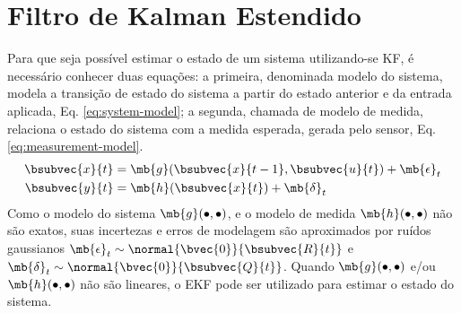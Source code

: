 \section{Filtro de Kalman Estendido}
\label{sec:ekf}
Para que seja possível estimar o estado de um sistema utilizando-se KF, é 
necessário conhecer duas equações: a primeira, denominada modelo do sistema, 
modela a transição de estado do sistema a partir do estado anterior e da entrada aplicada, Eq. \ref{eq:system-model}; a segunda, chamada de modelo de medida, relaciona o estado do sistema com a medida esperada, gerada pelo sensor, Eq. \ref{eq:measurement-model}. 
\begin{align}
  \bsubvec{x}{t} &= \mb{g}(\bsubvec{x}{t-1}, \bsubvec{u}{t}) + \mb{\epsilon}_t
  \label{eq:system-model}\\
  \bsubvec{y}{t} &= \mb{h}(\bsubvec{x}{t}) + \mb{\delta}_t
  \label{eq:measurement-model}
\end{align}
Como o modelo do sistema $\mb{g}(\mathord{\bullet}, \mathord{\bullet})$, e o modelo de medida $\mb{h}(\mathord{\bullet}, \mathord{\bullet})$ não são exatos, suas incertezas e erros de modelagem são aproximados por ruídos gaussianos $\mb{\epsilon}_t \sim \normal{\bvec{0}}{\bsubvec{R}{t}}$ e $\mb{\delta}_t \sim \normal{\bvec{0}}{\bsubvec{Q}{t}}$. Quando $\mb{g}(\mathord{\bullet}, \mathord{\bullet})$ e/ou $\mb{h}(\mathord{\bullet}, \mathord{\bullet})$ não são lineares, o EKF pode ser utilizado para estimar o estado 
do sistema. 

